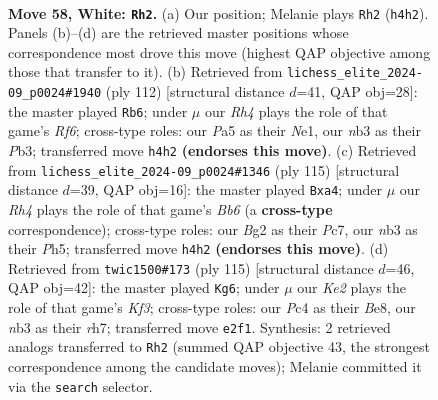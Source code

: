 \documentclass[11pt]{article}
\begin{document}
\clearpage

\begin{figure}[p]\centering
\begin{subfigure}{0.46\textwidth}\centering
\resizebox{\linewidth}{!}{%
\newchessgame
\chessboard[
  setfen={3r4/4b2p/p2p2k1/P3p2p/2P1P2R/1n3P2/1B2K1B1/8 w - - 2 58},
  showmover=false,
  pgfstyle=straightmove, color=movearrow, markmove={h4-h2}
]}
\caption{}
\end{subfigure}\hfill
\begin{subfigure}{0.46\textwidth}\centering
\resizebox{\linewidth}{!}{%
\newchessgame
\chessboard[
  setfen={3r2k1/4b2p/P4Rp1/5pP1/1p5P/1Pp4K/2P5/4N3 w - - 3 57},
  showmover=false,
  pgfstyle=straightmove, color=movearrow, markmove={f6-b6}
]}
\caption{}
\end{subfigure}
\\[4pt]
\begin{subfigure}{0.46\textwidth}\centering
\resizebox{\linewidth}{!}{%
\newchessgame
\chessboard[
  setfen={2k5/2p2p2/6p1/p5Pp/P3PK1P/1bPrBP2/8/2R5 b - - 2 58},
  showmover=false,
  pgfstyle=straightmove, color=movearrow, markmove={b3-a4}
]}
\caption{}
\end{subfigure}\hfill
\begin{subfigure}{0.46\textwidth}\centering
\resizebox{\linewidth}{!}{%
\newchessgame
\chessboard[
  setfen={4b3/7R/2p2k1p/p2r1p2/Pp6/1P1B1KPP/2P5/8 b - - 13 58},
  showmover=false,
  pgfstyle=straightmove, color=movearrow, markmove={f6-g6}
]}
\caption{}
\end{subfigure}
\caption{\textbf{Move 58, White: \texttt{Rh2}.} (a) Our position; Melanie plays \texttt{Rh2} (\texttt{h4h2}). Panels (b)--(d) are the retrieved master positions whose correspondence most drove this move (highest QAP objective among those that transfer to it). (b) Retrieved from \texttt{lichess\_elite\_2024-09\_p0024\#1940} (ply 112) [structural distance $d$=41, QAP obj=28]: the master played \texttt{Rb6}; under $\mu$ our \emph{Rh4} plays the role of that game's \emph{Rf6}; cross-type roles: our \emph{P}a5 as their \emph{N}e1, our \emph{n}b3 as their \emph{P}b3; transferred move \texttt{h4h2} \textbf{(endorses this move)}. (c) Retrieved from \texttt{lichess\_elite\_2024-09\_p0024\#1346} (ply 115) [structural distance $d$=39, QAP obj=16]: the master played \texttt{Bxa4}; under $\mu$ our \emph{Rh4} plays the role of that game's \emph{Bb6} (a \textbf{cross-type} correspondence); cross-type roles: our \emph{B}g2 as their \emph{P}c7, our \emph{n}b3 as their \emph{P}h5; transferred move \texttt{h4h2} \textbf{(endorses this move)}. (d) Retrieved from \texttt{twic1500\#173} (ply 115) [structural distance $d$=46, QAP obj=42]: the master played \texttt{Kg6}; under $\mu$ our \emph{Ke2} plays the role of that game's \emph{Kf3}; cross-type roles: our \emph{P}c4 as their \emph{B}e8, our \emph{n}b3 as their \emph{r}h7; transferred move \texttt{e2f1}. Synthesis: 2 retrieved analogs transferred to \texttt{Rh2} (summed QAP objective 43, the strongest correspondence among the candidate moves); Melanie committed it via the \texttt{search} selector.}
\label{fig:thought-m114}
\end{figure}
\end{document}
